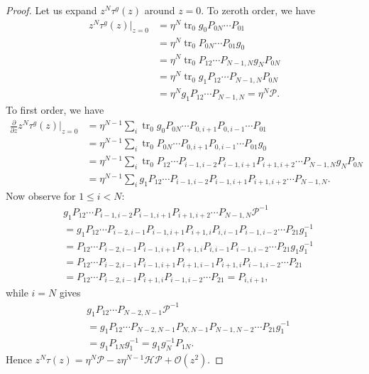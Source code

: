 \documentclass[11pt]{report}
\theoremstyle{definition}
\theoremstyle{remark}
\theoremstyle{remark}
\begin{document}
\begin{proof}
Let us expand $z^N \tau^g(z)$ around $z = 0$. To zeroth order, we have
\begin{align*}
z^N \tau^g(z)|_{z=0}
&= \eta^N \operatorname{tr}_0 g_0 P_{0N} \cdots P_{01} \\
&= \eta^N \operatorname{tr}_0 P_{0N} \cdots P_{01} g_0 \\
&= \eta^N \operatorname{tr}_0 P_{12} \cdots P_{N-1,N} g_N P_{0N} \\
&= \eta^N \operatorname{tr}_0 g_1 P_{12} \cdots P_{N-1,N} P_{0N} \\
&= \eta^N g_1 P_{12} \cdots P_{N-1,N} = \eta^N \mathcal{P}.
\end{align*}
To first order, we have
\begin{align*}
\frac{\partial}{\partial z} z^N \tau^g(z)|_{z=0}
&= \eta^{N-1} \sum_i \operatorname{tr}_0 g_0 P_{0N} \cdots P_{0,i+1} P_{0,i-1} \cdots P_{01} \\
&= \eta^{N-1} \sum_i \operatorname{tr}_0 P_{0N} \cdots P_{0,i+1} P_{0,i-1} \cdots P_{01} g_0 \\
&= \eta^{N-1} \sum_i \operatorname{tr}_0 P_{12} \cdots P_{i-1,i-2} P_{i-1,i+1} P_{i+1,i+2} \cdots P_{N-1,N} g_N P_{0N} \\
&= \eta^{N-1} \sum_i g_1 P_{12} \cdots P_{i-1,i-2} P_{i-1,i+1} P_{i+1,i+2} \cdots P_{N-1,N}.
\end{align*}
Now observe for $1 \leq i < N$:
\begin{align*}
& g_1 P_{12} \cdots P_{i-1,i-2} P_{i-1,i+1} P_{i+1,i+2} \cdots P_{N-1,N} \mathcal{P}^{-1} \\
&= g_1 P_{12} \cdots P_{i-2,i-1} P_{i-1,i+1} P_{i+1,i} P_{i,i-1} P_{i-1,i-2} \cdots P_{21} g_1^{-1} \\
&= P_{12} \cdots P_{i-2,i-1} P_{i-1,i+1} P_{i+1,i} P_{i,i-1} P_{i-1,i-2} \cdots P_{21} g_1 g_1^{-1} \\
&= P_{12} \cdots P_{i-2,i-1} P_{i-1,i+1} P_{i+1,i-1} P_{i+1,i} P_{i-1,i-2} \cdots P_{21} \\
&= P_{12} \cdots P_{i-2,i-1} P_{i+1,i} P_{i-1,i-2} \cdots P_{21} = P_{i,i+1},
\end{align*}
while $i=N$ gives
\begin{align*}
& g_1 P_{12} \cdots P_{N-2,N-1} \mathcal{P}^{-1} \\
&= g_1 P_{12} \cdots P_{N-2,N-1} P_{N,N-1} P_{N-1,N-2} \cdots P_{21} g_1^{-1} \\
&= g_1 P_{1N} g_1^{-1} = g_1 g_N^{-1} P_{1N}.
\end{align*}
Hence $z^N \tau(z) = \eta^N \mathcal{P} - z \eta^{N-1} \mathcal{H} \mathcal{P} + \mathcal{O}(z^2)$.
\end{proof}
\end{document}
